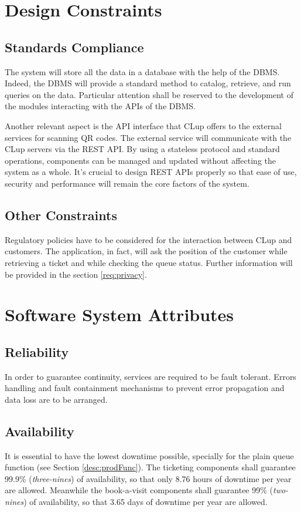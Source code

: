 \section{Design Constraints}

\subsection{Standards Compliance}
The system will store all the data in a database with the help of the DBMS. Indeed, the DBMS will provide a standard method to catalog, retrieve, and run queries on the data. Particular attention shall be reserved to the development of the modules interacting with the APIs of the DBMS.

Another relevant aspect is the API interface that CLup offers to the external services for scanning QR codes. The external service will communicate with the CLup servers via the REST API. By using a stateless protocol and standard operations, components can be managed and updated without affecting the system as a whole.\newline
It’s crucial to design REST APIs properly so that ease of use, security and performance will remain the core factors of the system.

\subsection{Other Constraints}
Regulatory policies have to be considered for the interaction between CLup and customers. The application, in fact, will ask the position of the customer while retrieving a ticket and while checking the queue status. Further information will be provided in the section \ref{req:privacy}.

\section{Software System Attributes}

\subsection{Reliability}
In order to guarantee continuity, services are required to be fault tolerant. Errors handling and fault containment mechanisms to prevent error propagation and data loss are to be arranged.

\subsection{Availability}
It is essential to have the lowest downtime possible, specially for the plain queue function (see Section \ref{desc:prodFunc}).
The ticketing components shall guarantee 99.9\% (\textit{three-nines}) of availability, so that only 8.76 hours of downtime per year are allowed.
Meanwhile the book-a-visit components shall guarantee 99\% (\textit{two-nines}) of availability, so that 3.65 days of downtime per year are allowed.

